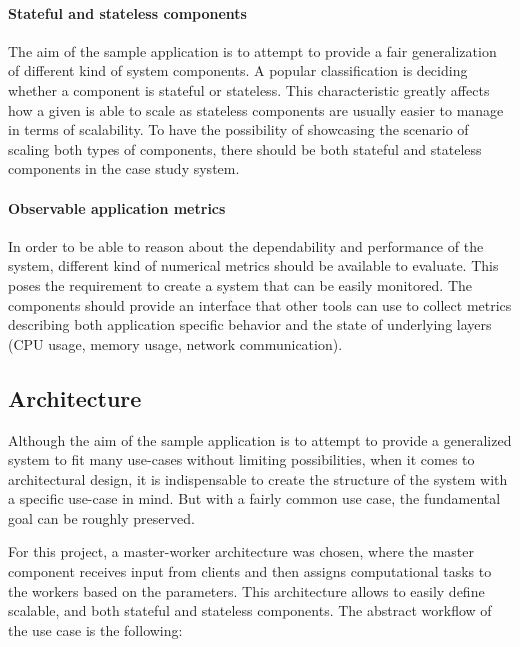 \paragraph{Stateful and stateless components}The aim of the sample application is to attempt to provide a fair generalization of different kind of system components. A popular classification is deciding whether a component is stateful or stateless. This characteristic greatly affects how a given is able to scale as stateless components are usually easier to manage in terms of scalability. To have the possibility of showcasing the scenario of scaling both types of components, there should be both stateful and stateless components in the case study system.

\paragraph{Observable application metrics}In order to be able to reason about the dependability and performance of the system, different kind of numerical metrics should be available to evaluate. This poses the requirement to create a system that can be easily monitored. The 
components should provide an interface that other tools can use to collect metrics describing both application specific behavior and the state of underlying layers (\eg CPU usage, memory usage, network communication).


\subsection{Architecture}

Although the aim of the sample application is to attempt to provide a generalized system to fit many use-cases without limiting possibilities, when it comes to architectural design, it is indispensable to create the structure of the system with a specific use-case in mind. But with a fairly common use case, the fundamental goal can be roughly preserved.

For this project, a master-worker architecture was chosen, where the master component receives input from clients and then assigns computational tasks to the workers based on the parameters. This architecture allows to easily define scalable, and both stateful and stateless components. The abstract workflow of the use case is the following:

